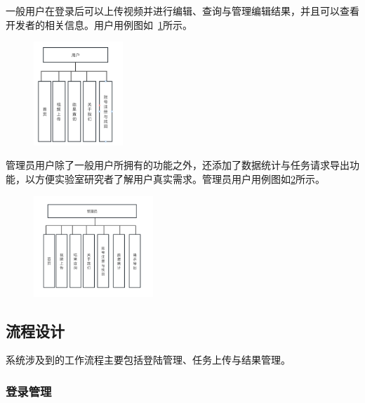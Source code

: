 一般用户在登录后可以上传视频并进行编辑、查询与管理编辑结果，并且可以查看开发者的相关信息。用户用例图如~\ref{fig:user_uml}所示。
\begin{figure}[ht]
    \centering
    \includegraphics[width=0.3\textwidth]{source/img/user_uml.png}
    \label{fig:user_uml}
\end{figure}
管理员用户除了一般用户所拥有的功能之外，还添加了数据统计与任务请求导出功能，以方便实验室研究者了解用户真实需求。管理员用户用例图如\ref{fig:admin_uml}所示。
\begin{figure}[ht]
    \centering
    \includegraphics[width=0.4\textwidth]{source/img/admin_uml.png}
    \label{fig:admin_uml}
\end{figure}

\subsection{流程设计}

系统涉及到的工作流程主要包括登陆管理、任务上传与结果管理。

\subsubsection{登录管理}

